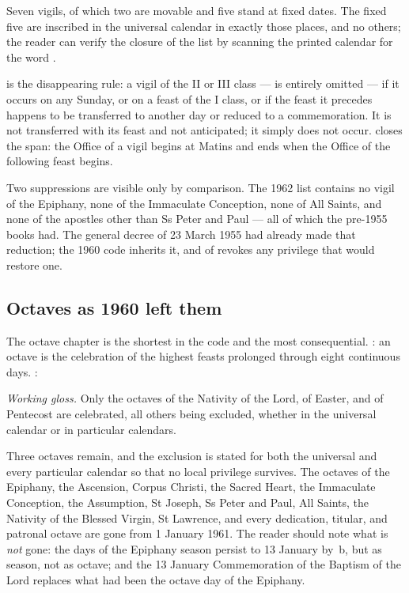 Seven vigils, of which two are movable and five stand at fixed dates. The fixed five are
inscribed in the universal calendar in exactly those places, and no others; the reader can
verify the closure of the list by scanning the printed calendar for the word .

 is the disappearing rule: a vigil of the II or III class  —
is entirely omitted — if it occurs on any Sunday, or on a feast of the I class, or if the feast
it precedes happens to be transferred to another day or reduced to a commemoration. It is not
transferred with its feast and not anticipated; it simply does not occur.  closes the
span: the Office of a vigil begins at Matins and ends when the Office of the following feast
begins.

Two suppressions are visible only by comparison. The 1962 list contains no vigil of the
Epiphany, none of the Immaculate Conception, none of All Saints, and none of the apostles other
than Ss Peter and Paul — all of which the pre-1955 books had. The general decree of 23 March 1955
had already made that reduction; the 1960 code inherits it, and  of  revokes any privilege that would restore one.

\subsection{Octaves as 1960 left them}

The octave chapter is the shortest in the code and the most consequential. : an octave is
the celebration of the highest feasts prolonged through eight continuous days. :

\begin{studyframe}
\medskip

\textit{Working gloss.} Only the octaves of the Nativity of the Lord, of Easter, and of
Pentecost are celebrated, all others being excluded, whether in the universal calendar or in
particular calendars.
\end{studyframe}

Three octaves remain, and the exclusion is stated for both the universal and every particular
calendar so that no local privilege survives. The octaves of the Epiphany, the Ascension, Corpus
Christi, the Sacred Heart, the Immaculate Conception, the Assumption, St Joseph, Ss Peter and
Paul, All Saints, the Nativity of the Blessed Virgin, St Lawrence, and every dedication,
titular, and patronal octave are gone from 1 January 1961. The reader should note what is
\emph{not} gone: the days of the Epiphany season persist to 13 January by \,b, but as
season, not as octave; and the 13 January Commemoration of the Baptism of the Lord replaces
what had been the octave day of the Epiphany.

